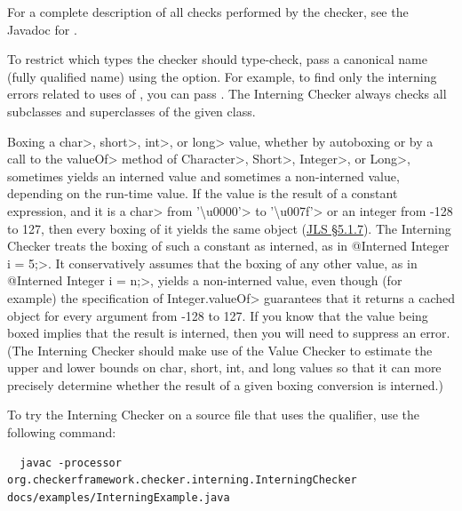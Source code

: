 For a complete description of all checks performed by
  the checker, see the Javadoc for
  .

\label{checking-class}
To restrict which types the checker should type-check, pass a canonical
name (fully qualified name) using the  option.
For example, to find only the
interning errors related to uses of , you can pass
.  The Interning Checker always checks all
subclasses and superclasses of the given class.




Boxing a \<char>, \<short>, \<int>, or \<long> value, whether by
autoboxing or by a call to the \<valueOf> method of \<Character>,
\<Short>, \<Integer>, or \<Long>, sometimes yields an interned value and
sometimes a non-interned value, depending on the run-time value.
If the value is the result of a constant expression, and it is a \<char> from
\<'\textbackslash u0000'> to \<'\textbackslash u007f'> or an integer from
-128 to 127, then every boxing of it yields the same object
(\href{https://docs.oracle.com/javase/specs/jls/se25/html/jls-5.html#jls-5.1.7}{JLS
\S5.1.7}).  The Interning Checker treats the boxing of such a constant as
interned, as in \<@Interned Integer i = 5;>.  It conservatively assumes that
the boxing of any other value, as in \<@Interned Integer i = n;>, yields a
non-interned value, even though (for example) the specification of
\<Integer.valueOf> guarantees that it returns a cached object for every
argument from -128 to 127.  If you know that the value being boxed implies that the result is
interned, then you will need to suppress an error.
(The Interning Checker should make use of the Value Checker to estimate the upper
and lower bounds on char, short, int, and long values so that it can more
precisely determine whether the result of a given boxing conversion is
interned.)



To try the Interning Checker on a source file that uses the  qualifier,
use the following command:

\begin{mysmall}
\begin{Verbatim}
  javac -processor org.checkerframework.checker.interning.InterningChecker docs/examples/InterningExample.java
\end{Verbatim}
\end{mysmall}

